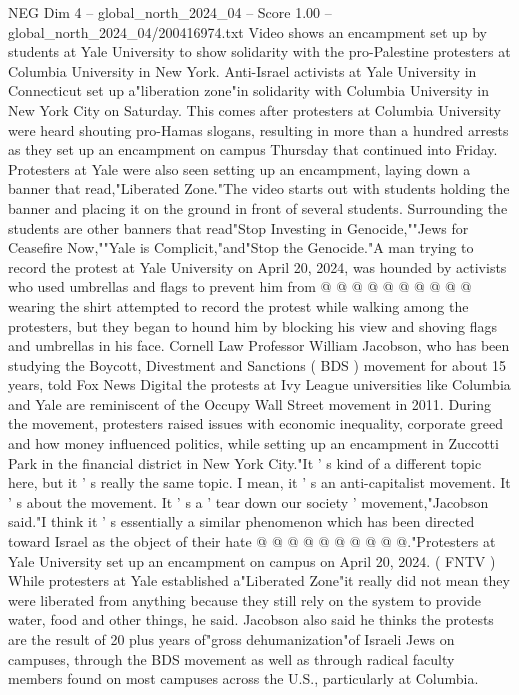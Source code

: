\begin{textsample}{NEG Dim 4 – global\_north\_2024\_04 – Score 1.00 – global\_north\_2024\_04/200416974.txt}  \label{ex:f4_neg_094}
Video shows an encampment set up by students at Yale University to show solidarity with the pro-Palestine protesters at Columbia University in New York.
Anti-Israel activists at Yale University in Connecticut set up a"liberation zone"in solidarity with Columbia University in New York City on Saturday.
This comes after protesters at Columbia University were heard shouting pro-Hamas slogans, resulting in more than a hundred arrests as they set up an encampment on campus Thursday that continued into Friday.
Protesters at Yale were also seen setting up an encampment, laying down a banner that read,"Liberated Zone."The video starts out with students holding the banner and placing it on the ground in front of several students.
Surrounding the students are other banners that read"Stop Investing in Genocide,""Jews for Ceasefire Now,""Yale is Complicit,"and"Stop the Genocide."A man trying to record the protest at Yale University on April 20, 2024, was hounded by activists who used umbrellas and flags to prevent him from @ @ @ @ @ @ @ @ @ @ wearing the shirt attempted to record the protest while walking among the protesters, but they began to hound him by blocking his view and shoving flags and umbrellas in his face.
Cornell Law Professor William Jacobson, who has been studying the Boycott, Divestment and Sanctions ( BDS ) movement for about 15 years, told Fox News Digital the protests at Ivy League universities like Columbia and Yale are reminiscent of the Occupy Wall Street movement in 2011.
During the movement, protesters raised issues with economic inequality, corporate greed and how money influenced politics, while setting up an encampment in Zuccotti Park in the financial district in New York City."It ' s kind of a different topic here, but it ' s really the same topic.
I mean, it ' s an anti-capitalist movement.
It ' s about the movement.
It ' s a ' tear down our society ' movement,"Jacobson said."I think it ' s essentially a similar phenomenon which has been directed toward Israel as the object of their hate @ @ @ @ @ @ @ @ @ @."Protesters at Yale University set up an encampment on campus on April 20, 2024. ( FNTV ) While protesters at Yale established a"Liberated Zone"it really did not mean they were liberated from anything because they still rely on the system to provide water, food and other things, he said.
Jacobson also said he thinks the protests are the result of 20 plus years of"gross dehumanization"of Israeli Jews on campuses, through the BDS movement as well as through radical faculty members found on most campuses across the U.S., particularly at Columbia.

\end{textsample}
